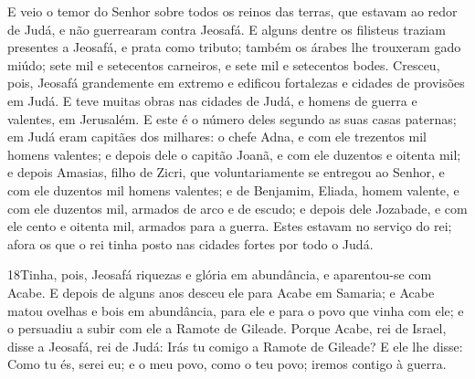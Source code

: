 E veio o temor do Senhor sobre todos os reinos das terras, que
estavam ao redor de Judá, e não guerrearam contra Jeosafá. E
alguns dentre os filisteus traziam presentes a Jeosafá, e prata como
tributo; também os árabes lhe trouxeram gado miúdo; sete mil e
setecentos carneiros, e sete mil e setecentos bodes. Cresceu,
pois, Jeosafá grandemente em extremo e edificou fortalezas e cidades
de provisões em Judá. E teve muitas obras nas cidades de
Judá, e homens de guerra e valentes, em Jerusalém. E este é o
número deles segundo as suas casas paternas; em Judá eram capitães
dos milhares: o chefe Adna, e com ele trezentos mil homens valentes;
e depois dele o capitão Joanã, e com ele duzentos e oitenta
mil; e depois Amasias, filho de Zicri, que voluntariamente se
entregou ao Senhor, e com ele duzentos mil homens valentes; e
de Benjamim, Eliada, homem valente, e com ele duzentos mil, armados
de arco e de escudo; e depois dele Jozabade, e com ele cento
e oitenta mil, armados para a guerra. Estes estavam no
serviço do rei; afora os que o rei tinha posto nas cidades fortes
por todo o Judá.

\medskip

\lettrine{18} Tinha, pois, Jeosafá riquezas e glória em
abundância, e aparentou-se com Acabe. E depois de alguns anos
desceu ele para Acabe em Samaria; e Acabe matou ovelhas e bois em
abundância, para ele e para o povo que vinha com ele; e o persuadiu
a subir com ele a Ramote de Gileade. Porque Acabe, rei de
Israel, disse a Jeosafá, rei de Judá: Irás tu comigo a Ramote de
Gileade? E ele lhe disse: Como tu és, serei eu; e o meu povo, como o
teu povo; iremos contigo à guerra.

